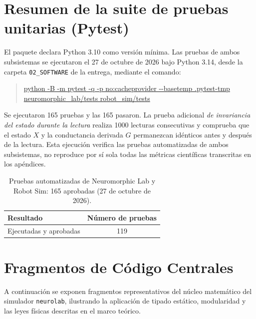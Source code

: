 

\section{Resumen de la suite de pruebas unitarias (Pytest)}
\label{sec:suite_tests}

El paquete declara Python 3.10 como versión mínima. Las pruebas de ambos subsistemas se ejecutaron el 27 de octubre de 2026
bajo Python 3.14, desde la carpeta \texttt{02\_SOFTWARE} de la entrega,
mediante el comando:
\begin{quote}
\raggedright\small
\url{python -B -m pytest -q -p no:cacheprovider --basetemp .pytest-tmp neuromorphic_lab/tests robot_sim/tests}
\end{quote}
Se ejecutaron 165 pruebas y las 165 pasaron. La prueba adicional
\textit{de invariancia del estado durante la lectura} realiza 1000 lecturas
consecutivas y comprueba que el estado $X$ y la conductancia derivada
$G$ permanezcan idénticos antes y después de la lectura. Esta ejecución
verifica las pruebas automatizadas de ambos subsistemas, no reproduce
por sí sola todas las métricas científicas transcritas en los apéndices.

\begin{table}[H]
\caption{Pruebas automatizadas de Neuromorphic Lab y Robot Sim: 165 aprobadas (27 de octubre de 2026).}
\label{tab:resumen_tests}
\centering
\begin{tabular}{l c}
\toprule
Resultado & Número de pruebas \\
\midrule
Ejecutadas y aprobadas & 119 \\
\bottomrule
\end{tabular}
\end{table}

\section{Fragmentos de Código Centrales}
\label{sec:fragmentos_codigo}

A continuación se exponen fragmentos representativos del núcleo matemático del simulador \texttt{neurolab}, ilustrando la aplicación de tipado estático, modularidad y las leyes físicas descritas en el marco teórico.

